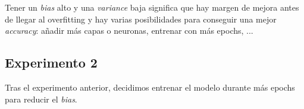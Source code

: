 \documentclass{article}
\begin{document}
		Tener un \textit{bias} alto y una \textit{variance} baja significa que hay margen de mejora antes de llegar al overfitting y hay varias posibilidades para conseguir una mejor \textit{accuracy}: a\~nadir m\'as capas o neuronas, entrenar con m\'as epochs, ...
		
		\subsection{Experimento 2}
			Tras el experimento anterior, decidimos entrenar el modelo durante m\'as epochs para reducir el \textit{bias}.
\end{document}
